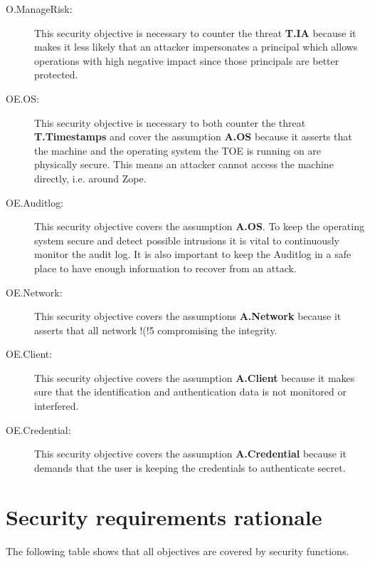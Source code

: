 \documentclass[12pt,english]{scrbook}
\begin{document}
\begin{description}
  \item[O.ManageRisk:] This security objective is necessary to counter the
  threat \textbf{T.IA} because it makes it less likely that an attacker
  impersonates a principal which allows operations with high negative impact
  since those principals are better protected.

  \item[OE.OS:] This security objective is necessary to both counter the
  threat \textbf{T.Timestamps} and cover the assumption \textbf{A.OS} because
  it asserts that the machine and the operating system the TOE is running on
  are physically secure. This means an attacker cannot access the machine
  directly, i.e. around Zope.

  \item[OE.Auditlog:] This security objective covers the assumption
  \textbf{A.OS}. To keep the operating system secure and detect possible
  intrusions it is vital to continuously monitor the audit log. It is also
  important to keep the Auditlog in a safe place to have enough information to
  recover from an attack.

  \item[OE.Network:] This security objective covers the assumptions
  \textbf{A.Network} because it asserts that all
  network !(!5
  compromising the integrity.

  \item[OE.Client:] This security objective covers the assumption
  \textbf{A.Client} because it makes sure that the identification and
  authentication data is not monitored or interfered.

  \item[OE.Credential:] This security objective covers the assumption
  \textbf{A.Credential} because it demands that the user is keeping the
  credentials to authenticate secret.
  
\end{description}



\section{Security requirements rationale}

The following table shows that all objectives are covered by security
functions.
\end{document}
